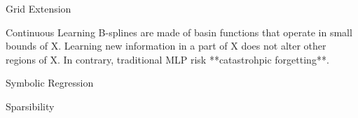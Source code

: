 \documentclass[aspectratio=169]{beamer}
\begin{document}
\begin{frame}{Grid Extension}

\end{frame}

\begin{frame}{Continuous Learning}
B-splines are made of basin functions that operate in small bounds of X. Learning new information in a part of X does not alter other regions of X. In contrary, traditional MLP risk **catastrohpic forgetting**.
\end{frame}

\begin{frame}{Symbolic Regression}

\end{frame}

\begin{frame}{Sparsibility}

\end{frame}
\end{document}
